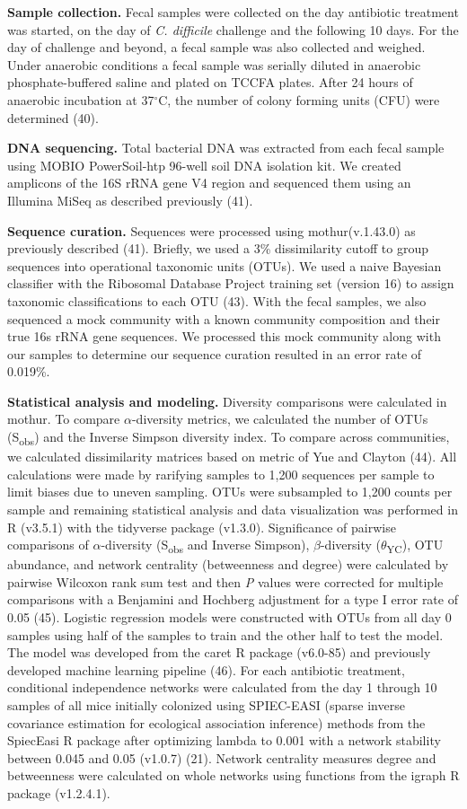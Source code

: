 \documentclass[12pt,]{article}
\begin{document}
\textbf{Sample collection.} Fecal samples were collected on the day
antibiotic treatment was started, on the day of \emph{C. difficile}
challenge and the following 10 days. For the day of challenge and
beyond, a fecal sample was also collected and weighed. Under anaerobic
conditions a fecal sample was serially diluted in anaerobic
phosphate-buffered saline and plated on TCCFA plates. After 24 hours of
anaerobic incubation at 37\(^\circ\)C, the number of colony forming
units (CFU) were determined (40).

\textbf{DNA sequencing.} Total bacterial DNA was extracted from each
fecal sample using MOBIO PowerSoil-htp 96-well soil DNA isolation kit.
We created amplicons of the 16S rRNA gene V4 region and sequenced them
using an Illumina MiSeq as described previously (41).

\textbf{Sequence curation.} Sequences were processed using
mothur(v.1.43.0) as previously described (41). Briefly, we used a 3\%
dissimilarity cutoff to group sequences into operational taxonomic units
(OTUs). We used a naive Bayesian classifier with the Ribosomal Database
Project training set (version 16) to assign taxonomic classifications to
each OTU (43). With the fecal samples, we also sequenced a mock
community with a known community composition and their true 16s rRNA
gene sequences. We processed this mock community along with our samples
to determine our sequence curation resulted in an error rate of 0.019\%.

\textbf{Statistical analysis and modeling.} Diversity comparisons were
calculated in mothur. To compare \(\alpha\)-diversity metrics, we
calculated the number of OTUs (S\textsubscript{obs}) and the Inverse
Simpson diversity index. To compare across communities, we calculated
dissimilarity matrices based on metric of Yue and Clayton (44). All
calculations were made by rarifying samples to 1,200 sequences per
sample to limit biases due to uneven sampling. OTUs were subsampled to
1,200 counts per sample and remaining statistical analysis and data
visualization was performed in R (v3.5.1) with the tidyverse package
(v1.3.0). Significance of pairwise comparisons of \(\alpha\)-diversity
(S\textsubscript{obs} and Inverse Simpson), \(\beta\)-diversity
(\(\theta\)\textsubscript{YC}), OTU abundance, and network centrality
(betweenness and degree) were calculated by pairwise Wilcoxon rank sum
test and then \emph{P} values were corrected for multiple comparisons
with a Benjamini and Hochberg adjustment for a type I error rate of 0.05
(45). Logistic regression models were constructed with OTUs from all day
0 samples using half of the samples to train and the other half to test
the model. The model was developed from the caret R package (v6.0-85)
and previously developed machine learning pipeline (46). For each
antibiotic treatment, conditional independence networks were calculated
from the day 1 through 10 samples of all mice initially colonized using
SPIEC-EASI (sparse inverse covariance estimation for ecological
association inference) methods from the SpiecEasi R package after
optimizing lambda to 0.001 with a network stability between 0.045 and
0.05 (v1.0.7) (21). Network centrality measures degree and betweenness
were calculated on whole networks using functions from the igraph R
package (v1.2.4.1).
\end{document}
